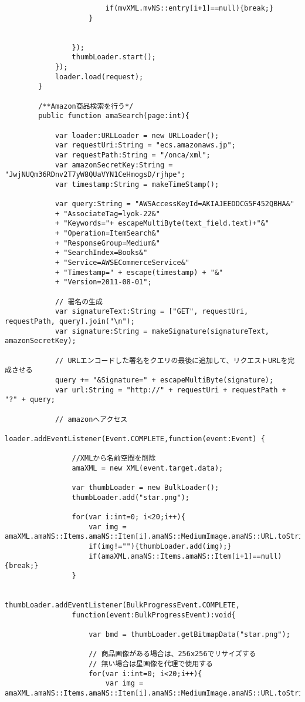 {\begin{verbatim}
						if(mvXML.mvNS::entry[i+1]==null){break;}
					}
					
					
				});
				thumbLoader.start();
			});
			loader.load(request);
		}
		
		/**Amazon商品検索を行う*/
		public function amaSearch(page:int){
			
			var loader:URLLoader = new URLLoader();
			var requestUri:String = "ecs.amazonaws.jp";
			var requestPath:String = "/onca/xml";
			var amazonSecretKey:String = "JwjNUQm36RDnv2T7yW8QUaVYN1CeHmogsD/rjhpe";
			var timestamp:String = makeTimeStamp();
			
			var query:String = "AWSAccessKeyId=AKIAJEEDDCG5F452QBHA&"
			+ "AssociateTag=lyok-22&"
			+ "Keywords="+ escapeMultiByte(text_field.text)+"&"
			+ "Operation=ItemSearch&"
			+ "ResponseGroup=Medium&"
			+ "SearchIndex=Books&"
			+ "Service=AWSECommerceService&"
			+ "Timestamp=" + escape(timestamp) + "&"
			+ "Version=2011-08-01";
			
			// 署名の生成
			var signatureText:String = ["GET", requestUri, requestPath, query].join("\n");
			var signature:String = makeSignature(signatureText, amazonSecretKey);
			
			// URLエンコードした署名をクエリの最後に追加して、リクエストURLを完成させる
			query += "&Signature=" + escapeMultiByte(signature);
			var url:String = "http://" + requestUri + requestPath + "?" + query;
			
			// amazonへアクセス
			loader.addEventListener(Event.COMPLETE,function(event:Event) {
									
				//XMLから名前空間を削除
				amaXML = new XML(event.target.data);
				
				var thumbLoader = new BulkLoader();
				thumbLoader.add("star.png");
				
				for(var i:int=0; i<20;i++){
					var img = amaXML.amaNS::Items.amaNS::Item[i].amaNS::MediumImage.amaNS::URL.toString();
					if(img!=""){thumbLoader.add(img);}
					if(amaXML.amaNS::Items.amaNS::Item[i+1]==null){break;}
				}
				
				thumbLoader.addEventListener(BulkProgressEvent.COMPLETE,
				function(event:BulkProgressEvent):void{
											 
					var bmd = thumbLoader.getBitmapData("star.png");
					
					// 商品画像がある場合は、256x256でリサイズする
					// 無い場合は星画像を代理で使用する
					for(var i:int=0; i<20;i++){
						var img = amaXML.amaNS::Items.amaNS::Item[i].amaNS::MediumImage.amaNS::URL.toString();
						

\end{verbatim}}
